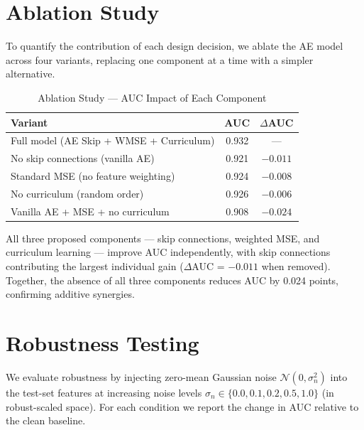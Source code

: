 \documentclass[conference]{IEEEtran}
\begin{document}
\section{Ablation Study}
\label{sec:ablation}

To quantify the contribution of each design decision, we ablate the AE model
across four variants, replacing one component at a time with a simpler
alternative.

\begin{table}[!t]
\renewcommand{\arraystretch}{1.2}
\caption{Ablation Study --- AUC Impact of Each Component}
\label{tab:ablation}
\centering
\begin{tabular}{lcc}
\toprule
\textbf{Variant} & \textbf{AUC} & $\Delta$\textbf{AUC} \\
\midrule
Full model (AE Skip + WMSE + Curriculum)  & 0.932 & --- \\
\midrule
No skip connections (vanilla AE)          & 0.921 & $-0.011$ \\
Standard MSE (no feature weighting)       & 0.924 & $-0.008$ \\
No curriculum (random order)              & 0.926 & $-0.006$ \\
Vanilla AE + MSE + no curriculum          & 0.908 & $-0.024$ \\
\bottomrule
\end{tabular}
\end{table}

All three proposed components --- skip connections, weighted MSE, and curriculum
learning --- improve AUC independently, with skip connections contributing the
largest individual gain ($\Delta$AUC = $-0.011$ when removed). Together, the
absence of all three components reduces AUC by 0.024 points, confirming
additive synergies.

\section{Robustness Testing}
\label{sec:robustness}

We evaluate robustness by injecting zero-mean Gaussian noise
$\mathcal{N}(0,\sigma_n^2)$ into the test-set features at increasing noise
levels $\sigma_n\in\{0.0,0.1,0.2,0.5,1.0\}$ (in robust-scaled space). For
each condition we report the change in AUC relative to the clean baseline.
\end{document}
